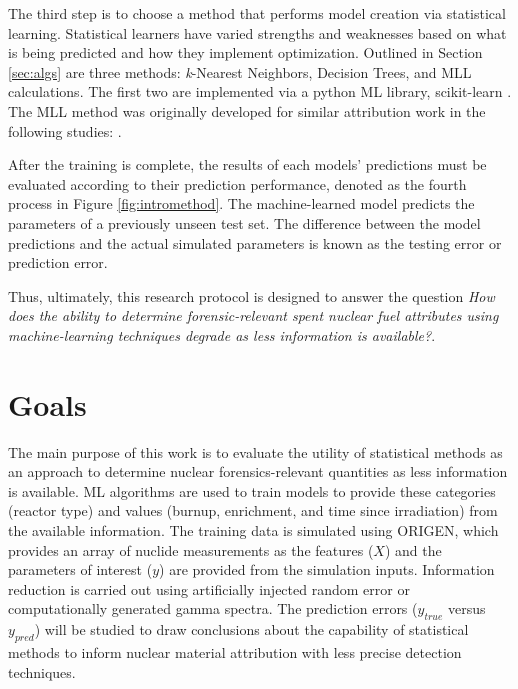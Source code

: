 The third step is to choose a method that performs model creation via
statistical learning.  Statistical learners have varied strengths and
weaknesses based on what is being predicted and how they implement
optimization. Outlined in Section \ref{sec:algs} are three methods:
\textit{k}-Nearest Neighbors, Decision Trees, and \gls{MLL} calculations. The
first two are implemented via a python \gls{ML} library, scikit-learn
\cite{scikit}. The \gls{MLL} method was originally developed for similar
attribution work in the following studies: \cite{mll_method, mll_sensitivity,
mll_validate}.

After the training is complete, the results of each models' predictions must be
evaluated according to their prediction performance, denoted as the fourth
process in Figure \ref{fig:intromethod}.  The machine-learned model predicts
the parameters of a previously unseen test set.  The difference between the
model predictions and the actual simulated parameters is known as the testing
error or prediction error.  

Thus, ultimately, this research protocol is designed to answer the question
\textit{How does the ability to determine forensic-relevant spent nuclear fuel
attributes using machine-learning techniques degrade as less information is
available?}. 

\section{Goals}

The main purpose of this work is to evaluate the utility of statistical methods
as an approach to determine nuclear forensics-relevant quantities as less
information is available. \Gls{ML} algorithms are used to train models to
provide these categories (reactor type) and values (burnup, enrichment, and
time since irradiation) from the available information.  The training data is
simulated using \gls{ORIGEN}, which provides an array of nuclide measurements
as the features ($X$) and the parameters of interest ($y$) are provided from
the simulation inputs. Information reduction is carried out using artificially
injected random error or computationally generated gamma spectra. The
prediction errors ($y_{true}$ versus $y_{pred}$) will be studied to draw
conclusions about the capability of statistical methods to inform nuclear
material attribution with less precise detection techniques.


